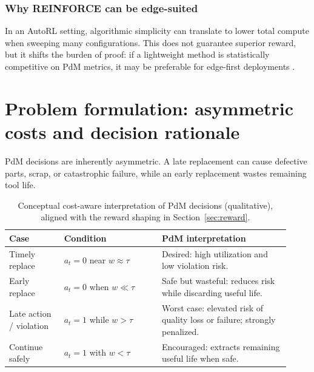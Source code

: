 \documentclass[refree,sn-basic]{sn-jnl} %
\begin{document}
\subsubsection{Why REINFORCE can be edge-suited}
In an AutoRL setting, algorithmic simplicity can translate to lower total compute when sweeping many configurations. This does not guarantee superior reward, but it shifts the burden of proof: if a lightweight method is statistically competitive on PdM metrics, it may be preferable for edge-first deployments \cite{Schwartz2020, Njor2024}.

\section{Problem formulation: asymmetric costs and decision rationale}
\label{sec:problem}
PdM decisions are inherently asymmetric. A late replacement can cause defective parts, scrap, or catastrophic failure, while an early replacement wastes remaining tool life.

\begin{table}[t]
        \centering
        \caption{Conceptual cost-aware interpretation of PdM decisions (qualitative), aligned with the reward shaping in Section~\ref{sec:reward}.}
        \label{tab:cost_view}
        \begin{tabular}{p{0.18\linewidth} p{0.32\linewidth} p{0.42\linewidth}}
                \toprule
                \textbf{Case} & \textbf{Condition} & \textbf{PdM interpretation}\\
                \midrule
                Timely replace & $a_t=0$ near $w\approx\tau$ & Desired: high utilization and low violation risk.\\
                Early replace & $a_t=0$ when $w\ll\tau$ & Safe but wasteful: reduces risk while discarding useful life.\\
                Late action / violation & $a_t=1$ while $w>\tau$ & Worst case: elevated risk of quality loss or failure; strongly penalized.\\
                Continue safely & $a_t=1$ with $w<\tau$ & Encouraged: extracts remaining useful life when safe.\\
                \bottomrule
        \end{tabular}
\end{table}
\end{document}
